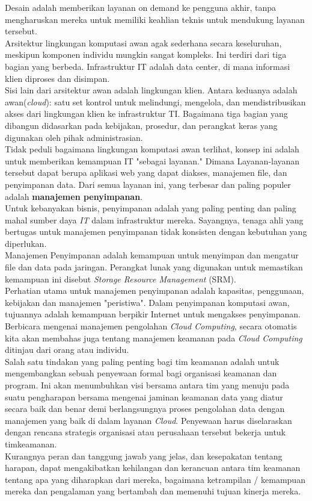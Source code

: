 Desain adalah memberikan layanan on demand ke pengguna akhir, tanpa mengharuskan mereka untuk memiliki  keahlian teknis untuk mendukung layanan tersebut.\\
Arsitektur lingkungan komputasi awan agak sederhana secara keseluruhan,  meskipun  komponen individu mungkin sangat kompleks. Ini terdiri dari tiga bagian yang berbeda. Infrastruktur IT adalah data center, di mana informasi klien diproses dan disimpan.\\
Sisi lain dari arsitektur awan adalah lingkungan klien.  Antara keduanya  adalah awan(\textit{cloud}):  satu set kontrol untuk melindungi, mengelola, dan mendistribusikan akses dari lingkungan klien ke infrastruktur TI. Bagaimana tiga bagian yang dibangun didasarkan pada kebijakan, prosedur, dan perangkat keras yang digunakan oleh pihak administrasian.\\
Tidak peduli bagaimana lingkungan komputasi awan terlihat, konsep ini adalah untuk memberikan kemampuan IT "sebagai layanan." Dimana Layanan-layanan  tersebut  dapat berupa aplikasi web yang dapat diakses, manajemen file, dan penyimpanan data. Dari semua layanan ini, yang terbesar dan paling populer adalah \textbf{manajemen penyimpanan}.\\
Untuk kebanyakan bisnis, penyimpanan adalah yang paling penting dan paling mahal sumber daya \textit{IT} dalam infrastruktur mereka. Sayangnya, tenaga ahli yang bertugas untuk manajemen penyimpanan tidak konsisten dengan kebutuhan yang diperlukan.\\
Manajemen Penyimpanan adalah kemampuan untuk menyimpan dan mengatur file dan data pada jaringan. Perangkat lunak yang digunakan untuk memastikan kemampuan ini disebut \textit{Storage Resource Management } (SRM).\\
Perhatian utama untuk manajemen penyimpanan adalah kapasitas, penggunaan, kebijakan dan manajemen "peristiwa". Dalam penyimpanan komputasi awan, tujuannya adalah kemampuan berpikir Internet untuk   mengakses penyimpanan.\\
\tab Berbicara mengenai manajemen pengolahan \textit{Cloud Computing}, secara otomatis  kita akan membahas juga tentang manajemen keamanan pada \textit{Cloud Computing} ditinjau dari orang atau individu.\\
Salah satu tindakan yang paling penting bagi tim keamanan adalah untuk mengembangkan sebuah penyewaan formal bagi organisasi keamanan dan program. Ini akan menumbuhkan visi bersama antara tim yang menuju pada suatu pengharapan bersama mengenai jaminan keamanan data yang diatur secara baik dan benar demi  berlangsungnya proses pengolahan data dengan manajemen yang baik di dalam layanan \textit{Cloud}. Penyewaan harus diselaraskan dengan rencana strategis organisasi  atau perusahaan tersebut  bekerja untuk timkeamanan.\\
Kurangnya peran dan tanggung jawab yang jelas, dan kesepakatan tentang harapan, dapat mengakibatkan kehilangan dan kerancuan antara tim keamanan tentang apa yang diharapkan dari mereka, bagaimana ketrampilan / kemampuan mereka dan pengalaman yang bertambah dan memenuhi  tujuan kinerja mereka.
